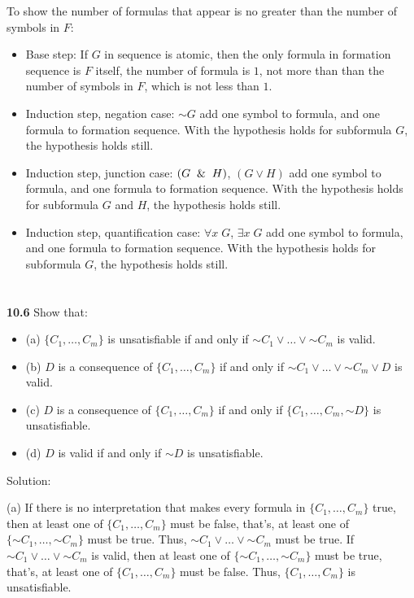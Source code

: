 \documentclass{ctexart}
\newcommand{\unsim}{\mathord{\sim}}
\begin{document}
To show the number of formulas that appear is no greater than the number of symbols in $F$:
\begin{itemize}
	\item Base step: If $G$ in sequence is atomic, then the only formula in formation sequence is $F$ itself,
	the number of formula is $1$, not more than than the number of symbols in $F$, which is not less
	than $1$.
	
	\item Induction step, negation case: $\unsim G$ add one symbol to formula, and one formula to formation
	sequence. With the hypothesis holds for subformula $G$, the hypothesis holds still.
	
	\item Induction step, junction case: $(G \And H)$, $(G \lor H)$ add one symbol to formula, and one formula to formation
	sequence. With the hypothesis holds for subformula $G$ and $H$, the hypothesis holds still.
	
	\item Induction step, quantification case: $\forall x\; G$, $\exists x\; G$ add one symbol to formula, and one formula to formation
	sequence. With the hypothesis holds for subformula $G$, the hypothesis holds still.
\end{itemize}

\section*{}
\textbf{10.6} Show that:
\begin{itemize}
\item (a) $\{C_1 , \dots , C_m \}$ is unsatisfiable if and only if $\unsim C_1 \lor \dots \lor \unsim C_m$ is valid.
\item (b) $D$ is a consequence of $\{C_1 , \dots , C_m \}$ if and only if $\unsim C_1 \lor \dots \lor \unsim C_m \lor D$
is valid.
\item (c) $D$ is a consequence of $\{C_1 , \dots , C_m \}$ if and only if $\{C_1 , \dots , C_m, \unsim D\}$ is
unsatisfiable.
\item (d) $D$ is valid if and only if $\unsim D$ is unsatisfiable.
\end{itemize}

Solution:

(a) If there is no interpretation that makes every formula in $\{C_1 , \dots , C_m \}$ true, then at least one
of $\{C_1 , \dots , C_m \}$ must be false, that's, at least one of $\{ \unsim C_1, \dots, \unsim C_m \}$ must
be true. Thus, $\unsim C_1 \lor \dots \lor \unsim C_m$ must be true.
If $\unsim C_1 \lor \dots \lor \unsim C_m$ is valid, then at least one of $\{ \unsim C_1, \dots, \unsim C_m \}$ must
be true, that's, at least one of $\{C_1 , \dots , C_m \}$ must be false. Thus, $\{C_1 , \dots , C_m \}$ is unsatisfiable.
\end{document}
